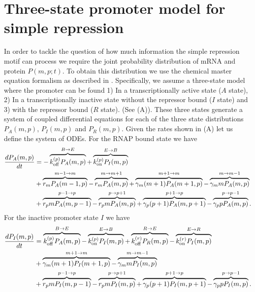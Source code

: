 \section{Three-state promoter model for simple repression}\label{supp_model}

In order to tackle the question of how much information the simple repression
motif can process we require the joint probability distribution of mRNA and
protein $P(m, p; t)$. To obtain this distribution we use the chemical master
equation formalism as described in . Specifically, we assume a
three-state model where the promoter can be found 1) In a transcriptionally
active state  ($A$ state), 2) In a transcriptionally inactive state without the
repressor bound ($I$ state) and 3) with the repressor bound ($R$ state). (See
(A)). These three states generate a system of coupled
differential equations for each of the three state distributions $P_A(m, p)$,
$P_I(m, p)$ and $P_R(m, p)$. Given the rates shown in
(A) let us define the system of ODEs. For the RNAP
bound state we have
\begin{equation}
  \begin{aligned}
    \dt{P_A(m, p)} &=
    - \overbrace{\kpoff P_A(m, p)}^{B \rightarrow E} %
    + \overbrace{\kpon P_I(m, p)}^{E \rightarrow B}\\ %
    &+ \overbrace{r_m P_A(m-1, p)}^{m-1 \rightarrow m} %
    - \overbrace{r_m P_A(m, p)}^{m \rightarrow m+1}%
    + \overbrace{\gm (m + 1) P_A(m+1 , p)}^{m+1 \rightarrow m} %
    - \overbrace{\gm m P_A(m , p)}^{m \rightarrow m-1}\\ %
    &+ \overbrace{r_p m P_A(m, p - 1)}^{p-1 \rightarrow p} %
    - \overbrace{r_p m P_A(m, p)}^{p \rightarrow p+1} %
    + \overbrace{\gp (p + 1) P_A(m, p + 1)}^{p + 1 \rightarrow p} %
    - \overbrace{\gp p P_A(m, p)}^{p \rightarrow p-1}. %
  \end{aligned}
\end{equation}
For the inactive promoter state $I$ we have
\begin{equation}
  \begin{aligned}
    \dt{P_I(m, p)} &=
    \overbrace{\kpoff P_A(m, p)}^{B \rightarrow E} %
    - \overbrace{\kpon P_I(m, p)}^{E \rightarrow B} %
    + \overbrace{\kroff P_R(m, p)}^{R \rightarrow E} %
    - \overbrace{\kron P_I(m, p)}^{E \rightarrow R}\\ %
    &+ \overbrace{\gm (m + 1) P_I(m+1 , p)}^{m+1 \rightarrow m} %
    - \overbrace{\gm m P_I(m , p)}^{m \rightarrow m-1}\\ %
    &+ \overbrace{r_p m P_I(m, p - 1)}^{p-1 \rightarrow p} %
    - \overbrace{r_p m P_I(m, p)}^{p \rightarrow p+1} %
    + \overbrace{\gp (p + 1) P_I(m, p + 1)}^{p + 1 \rightarrow p} %
    - \overbrace{\gp p P_I(m, p)}^{p \rightarrow p-1}. %
  \end{aligned}
\end{equation}
